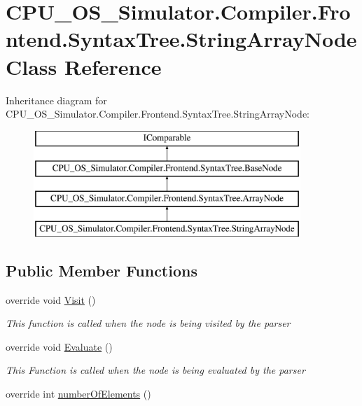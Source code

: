 \hypertarget{class_c_p_u___o_s___simulator_1_1_compiler_1_1_frontend_1_1_syntax_tree_1_1_string_array_node}{}\section{C\+P\+U\+\_\+\+O\+S\+\_\+\+Simulator.\+Compiler.\+Frontend.\+Syntax\+Tree.\+String\+Array\+Node Class Reference}
\label{class_c_p_u___o_s___simulator_1_1_compiler_1_1_frontend_1_1_syntax_tree_1_1_string_array_node}
Inheritance diagram for C\+P\+U\+\_\+\+O\+S\+\_\+\+Simulator.\+Compiler.\+Frontend.\+Syntax\+Tree.\+String\+Array\+Node\+:\begin{figure}[H]
\begin{center}
\leavevmode
\includegraphics[height=4.000000cm]{class_c_p_u___o_s___simulator_1_1_compiler_1_1_frontend_1_1_syntax_tree_1_1_string_array_node}
\end{center}
\end{figure}
\subsection*{Public Member Functions}
\begin{DoxyCompactItemize}
\item 
override void \hyperlink{class_c_p_u___o_s___simulator_1_1_compiler_1_1_frontend_1_1_syntax_tree_1_1_string_array_node_ae8ce8f85a313e577506546a26c954e34}{Visit} ()
\begin{DoxyCompactList}\small\item\em This function is called when the node is being visited by the parser \end{DoxyCompactList}\item 
override void \hyperlink{class_c_p_u___o_s___simulator_1_1_compiler_1_1_frontend_1_1_syntax_tree_1_1_string_array_node_a559630365acec250f2eed840010535f8}{Evaluate} ()
\begin{DoxyCompactList}\small\item\em This Function is called when the node is being evaluated by the parser \end{DoxyCompactList}\item 
override int \hyperlink{class_c_p_u___o_s___simulator_1_1_compiler_1_1_frontend_1_1_syntax_tree_1_1_string_array_node_aff86779eee1fe0119c3b717f6d673f2c}{number\+Of\+Elements} ()
\end{DoxyCompactItemize}
